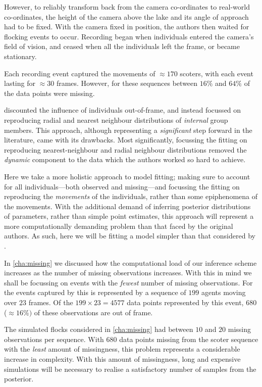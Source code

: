 However, to reliably transform back from the camera co-ordinates to real-world
co-ordinates, the height of the camera above the lake and its angle of approach
had to be fixed. With the camera fixed in position, the authors then waited for
flocking events to occur. Recording began when individuals entered the camera's
field of vision, and ceased when all the individuals left the frame, or became
stationary.

Each recording event captured the movements of $\approx170$ scoters,
with each event lasting for $\approx30$ frames. However, for these sequences
between $16\%$ and $64\%$ of the data points were missing.

\textcite{lukeman10} discounted the influence of individuals out-of-frame, and
instead focussed on reproducing radial and nearest neighbour distributions of
\emph{internal} group members. This approach, although representing a
\emph{significant} step forward in the literature, came with its drawbacks.
Most significantly, focussing the fitting on reproducing nearest-neighbour and
radial neighbour distributions removed the \emph{dynamic} component to the data
which the authors worked so hard to achieve.

Here we take a more holistic approach to model fitting; making sure to account
for all individuals---both observed and missing---and focussing the fitting on
reproducing the \emph{movements} of the individuals, rather than some
epiphenomena of the movements. With the additional demand of inferring
posterior distributions of parameters, rather than simple point estimates, this
approach will represent a more computationally demanding problem than that
faced by the original authors. As such, here we will be fitting a model simpler
than that considered by \textcite{lukeman10}.

In \cref{cha:missing} we discussed how the computational load of our inference
scheme increases as the number of missing observations increases. With this in
mind we shall be focussing on events with the \emph{fewest} number of missing
observations. For the events captured by \textcite{lukeman10} this is
represented by a sequence of $199$ agents moving over $23$ frames. Of the
$199\times23=4577$ data points represented by this event, $680$ ($\approx16\%)$
of these observations are out of frame.

The simulated flocks considered in \cref{cha:missing} had between $10$ and $20$
missing observations per sequence. With $680$ data points missing from the
scoter sequence with the \emph{least} amount of missingness, this problem
represents a considerable increase in complexity. With this amount of
missingness, long and expensive simulations will be necessary to realise a
satisfactory number of samples from the posterior.













